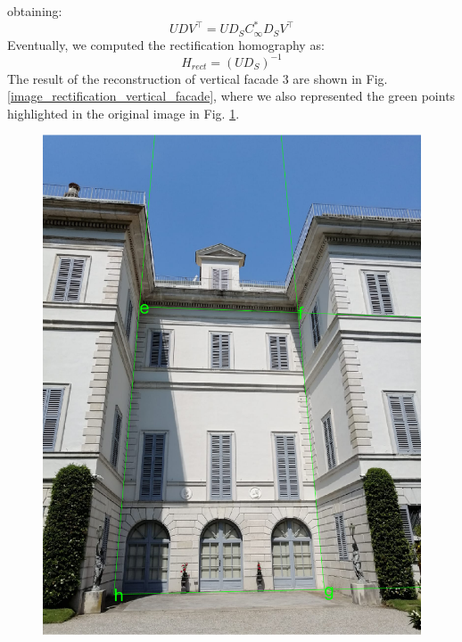 \documentclass[11pt, oneside]{article}
\begin{document}
obtaining:
\begin{equation}
	U D V^\intercal = U D_S C^*_\infty D_S V^\intercal
\end{equation}
Eventually, we computed the rectification homography as:
\begin{equation}
	H_{rect} = (U D_S)^{-1}
\end{equation}
The result of the reconstruction of vertical facade 3 are shown in Fig. \ref{image_rectification_vertical_facade}, where we also represented the green points highlighted in the original image in Fig. \ref{image_two_original_vertical_vp}.

\begin{figure}[!h]
	\centering
	\begin{minipage}{.45\textwidth}
		\centering
		\includegraphics[scale = 0.4]{image_two_original_vertical_vp.png}
		\label{image_two_original_vertical_vp}
	\end{minipage}%

\end{figure}
\end{document}
